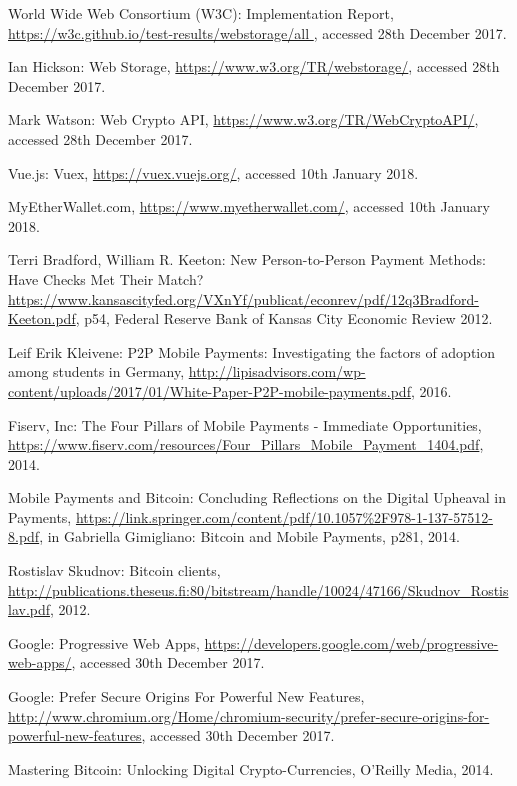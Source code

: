 \begin{thebibliography}{99}
 World Wide Web Consortium (W3C): Implementation Report, \url{https://w3c.github.io/test-results/webstorage/all
}, accessed 28th December 2017.

 Ian Hickson: Web Storage, \url{https://www.w3.org/TR/webstorage/}, accessed 28th December 2017.

 Mark Watson: Web Crypto API, \url{https://www.w3.org/TR/WebCryptoAPI/}, accessed 28th December 2017.

 Vue.js: Vuex, \url{https://vuex.vuejs.org/}, accessed 10th January 2018.

 MyEtherWallet.com, \url{https://www.myetherwallet.com/}, accessed 10th January 2018.

 Terri Bradford, William R. Keeton: New Person-to-Person
Payment Methods: Have Checks Met Their Match?  \url{https://www.kansascityfed.org/VXnYf/publicat/econrev/pdf/12q3Bradford-Keeton.pdf}, p54, Federal Reserve Bank of Kansas City Economic Review 2012.

 Leif Erik Kleivene: P2P Mobile Payments: Investigating the factors of adoption among students in Germany, \url{http://lipisadvisors.com/wp-content/uploads/2017/01/White-Paper-P2P-mobile-payments.pdf}, 2016.

 Fiserv, Inc: The Four Pillars of Mobile Payments - Immediate Opportunities, \url{https://www.fiserv.com/resources/Four_Pillars_Mobile_Payment_1404.pdf}, 2014.

Mobile Payments and Bitcoin: Concluding Reflections on the Digital Upheaval in Payments, \url{https://link.springer.com/content/pdf/10.1057\%2F978-1-137-57512-8.pdf}, in Gabriella Gimigliano: Bitcoin and Mobile Payments, p281, 2014.

Rostislav Skudnov: Bitcoin clients, \url{http://publications.theseus.fi:80/bitstream/handle/10024/47166/Skudnov_Rostislav.pdf}, 2012.

Google: Progressive Web Apps, \url{https://developers.google.com/web/progressive-web-apps/}, accessed 30th December 2017.

Google: Prefer Secure Origins For Powerful New Features,  \url{http://www.chromium.org/Home/chromium-security/prefer-secure-origins-for-powerful-new-features}, accessed 30th December 2017.

Mastering Bitcoin: Unlocking Digital Crypto-Currencies, O'Reilly Media, 2014.


\end{thebibliography}
